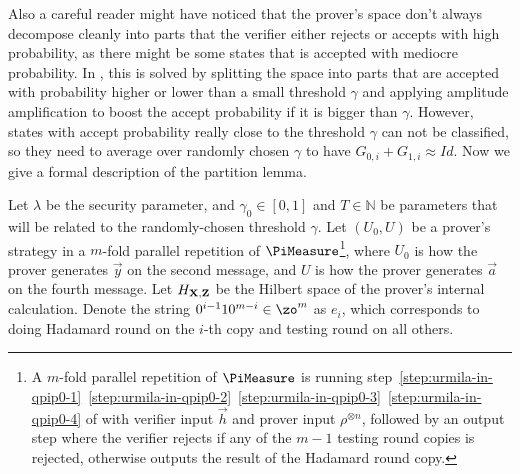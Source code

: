 Also a careful reader might have noticed that the prover's space don't always decompose cleanly into parts that the verifier either rejects or accepts with high probability, as there might be some states that is accepted with mediocre probability. In \cite{arXiv:ChiaChungYam19}, this is solved by splitting the space into parts that are accepted with probability higher or lower than a small threshold $\gamma$ and applying amplitude amplification to boost the accept probability if it is bigger than $\gamma$. However, states with accept probability really close to the threshold $\gamma$ can not be classified, so they need to average over randomly chosen $\gamma$ to have $G_{0,i}+G_{1,i} \approx Id$.
Now we give a formal description of the partition lemma.

\begin{lemma}\label{lem:partition2}
	Let $\lambda$ be the security parameter, and $\gamma_0 \in[0,1]$ and $T\in \mathbb{N}$ be parameters that will be related to the randomly-chosen threshold $\gamma$.
	Let $(U_0,U)$ be a prover's strategy in a $m$-fold parallel repetition of $\PiMeasure$\footnote{A $m$-fold parallel repetition of $\PiMeasure$ is running step~\ref{step:urmila-in-qpip0-1}~\ref{step:urmila-in-qpip0-2}~\ref{step:urmila-in-qpip0-3}~\ref{step:urmila-in-qpip0-4} of  with verifier input $\vec{h}$ and prover input $\rho^{\otimes n}$, followed by an output step where the verifier rejects if any of the $m-1$ testing round copies is rejected, otherwise outputs the result of the Hadamard round copy.}, where $U_0$ is how the prover generates $\vec{y}$ on the second message, and $U$ is how the prover generates $\vec{a}$ on the fourth message. Let $H_{\mathbf{X},\mathbf{Z}}$ be the Hilbert space of the prover's internal calculation.
	Denote the string $0^{i-1}10^{m-i} \in \zo^m $ as $e_i$, which corresponds to doing Hadamard round on the $i$-th copy and testing round on all others.


\end{lemma}
